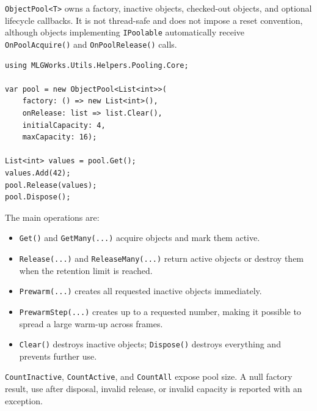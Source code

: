 \texttt{ObjectPool<T>} owns a factory, inactive objects, checked-out objects, and optional lifecycle callbacks. It is not thread-safe and does not impose a reset convention, although objects implementing \texttt{IPoolable} automatically receive \texttt{OnPoolAcquire()} and \texttt{OnPoolRelease()} calls.

\begin{lstlisting}
using MLGWorks.Utils.Helpers.Pooling.Core;

var pool = new ObjectPool<List<int>>(
    factory: () => new List<int>(),
    onRelease: list => list.Clear(),
    initialCapacity: 4,
    maxCapacity: 16);

List<int> values = pool.Get();
values.Add(42);
pool.Release(values);
pool.Dispose();
\end{lstlisting}

The main operations are:
\begin{itemize}
  \item \texttt{Get()} and \texttt{GetMany(...)} acquire objects and mark them active.
  \item \texttt{Release(...)} and \texttt{ReleaseMany(...)} return active objects or destroy them when the retention limit is reached.
  \item \texttt{Prewarm(...)} creates all requested inactive objects immediately.
  \item \texttt{PrewarmStep(...)} creates up to a requested number, making it possible to spread a large warm-up across frames.
  \item \texttt{Clear()} destroys inactive objects; \texttt{Dispose()} destroys everything and prevents further use.
\end{itemize}

\texttt{CountInactive}, \texttt{CountActive}, and \texttt{CountAll} expose pool size. A null factory result, use after disposal, invalid release, or invalid capacity is reported with an exception.
